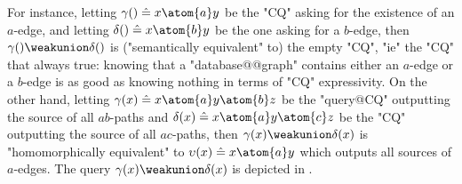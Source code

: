 \begin{marginfigure}[-6cm]
	\centering
	\begin{tikzpicture}
		
	\end{tikzpicture}
	\caption{
		\AP\label{fig:prelim-db-weak-union-cq}
		Two "CQs" (above and left)
		$\gamma(x) \defeq x \atom{a} y \atom{b} z$
		and $\delta(x) \defeq x \atom{a} y \atom{c} z$ and
		their "weak union" $\gamma(x) \weakunion \delta(x)$ (below right).
	}
\end{marginfigure}
For instance, letting $\gamma() \defeq x \atom{a} y$ be the "CQ" asking
for the existence of an $a$-edge,
and letting $\delta() \defeq x \atom{b} y$ be the one asking for a $b$-edge,
then $\gamma() \weakunion \delta()$ is ("semantically equivalent" to) the empty "CQ",
"ie" the "CQ" that always true: knowing that a "database@@graph" contains either an $a$-edge
or a $b$-edge is as good as knowing nothing in terms of "CQ" expressivity.
On the other hand, letting $\gamma(x) \defeq x \atom{a} y \atom{b} z$ be the "query@CQ"
outputting the source of all 
$ab$-paths and $\delta(x) \defeq x \atom{a} y \atom{c} z$ be the "CQ" outputting
the source of all $ac$-paths,
then $\gamma(x) \weakunion \delta(x)$ is "homomorphically equivalent" to
$\upsilon(x) \defeq x \atom{a} y$ which outputs all sources of $a$-edges.
The query $\gamma(x) \weakunion \delta(x)$ is depicted in .

